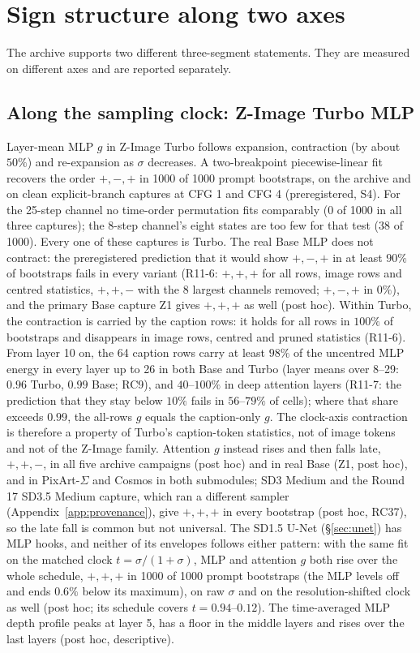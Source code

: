 \documentclass[11pt]{article}
\begin{document}
\section{Sign structure along two axes}\label{sec:topology}

The archive supports two different three-segment statements. They are measured on different axes and are reported separately.

\subsection{Along the sampling clock: Z-Image Turbo MLP}
Layer-mean MLP $g$ in Z-Image Turbo follows expansion, contraction (by about $50\%$) and re-expansion as $\sigma$ decreases. A two-breakpoint piecewise-linear fit \citep{muggeo2003estimating} recovers the order $+,-,+$ in 1000 of 1000 prompt bootstraps, on the archive and on clean explicit-branch captures at CFG 1 and CFG 4 (preregistered, S4). For the 25-step channel no time-order permutation fits comparably (0 of 1000 in all three captures); the 8-step channel's eight states are too few for that test (38 of 1000). Every one of these captures is Turbo. The real Base MLP does not contract: the preregistered prediction that it would show $+,-,+$ in at least $90\%$ of bootstraps fails in every variant (R11-6: $+,+,+$ for all rows, image rows and centred statistics, $+,+,-$ with the 8 largest channels removed; $+,-,+$ in $0\%$), and the primary Base capture Z1 gives $+,+,+$ as well (post hoc). Within Turbo, the contraction is carried by the caption rows: it holds for all rows in $100\%$ of bootstraps and disappears in image rows, centred and pruned statistics (R11-6). From layer 10 on, the 64 caption rows carry at least $98\%$ of the uncentred MLP energy in every layer up to 26 in both Base and Turbo (layer means over 8--29: $0.96$ Turbo, $0.99$ Base; RC9), and $40$--$100\%$ in deep attention layers (R11-7: the prediction that they stay below $10\%$ fails in $56$--$79\%$ of cells); where that share exceeds $0.99$, the all-rows $g$ equals the caption-only $g$. The clock-axis contraction is therefore a property of Turbo's caption-token statistics, not of image tokens and not of the Z-Image family. Attention $g$ instead rises and then falls late, $+,+,-$, in all five archive campaigns (post hoc) and in real Base (Z1, post hoc), and in PixArt-$\Sigma$ and Cosmos in both submodules; SD3 Medium and the Round 17 SD3.5 Medium capture, which ran a different sampler (Appendix~\ref{app:provenance}), give $+,+,+$ in every bootstrap (post hoc, RC37), so the late fall is common but not universal. The SD1.5 U-Net (\S\ref{sec:unet}) has MLP hooks, and neither of its envelopes follows either pattern: with the same fit on the matched clock $t=\sigma/(1+\sigma)$, MLP and attention $g$ both rise over the whole schedule, $+,+,+$ in 1000 of 1000 prompt bootstraps (the MLP levels off and ends $0.6\%$ below its maximum), on raw $\sigma$ and on the resolution-shifted clock as well (post hoc; its schedule covers $t=0.94$--$0.12$). The time-averaged MLP depth profile peaks at layer 5, has a floor in the middle layers and rises over the last layers (post hoc, descriptive). 
\end{document}
